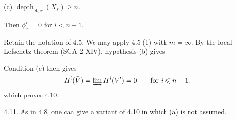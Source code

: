 (c) \underline{$\operatorname{depth}_{\mathrm{\acute{e}t},x}(X_s)
\geqslant n$.}

\underline{Then $\phi^i_x=0$ for $i<n-1$.}

Retain the notation of 4.5. We may apply 4.5 (1) with $m=\infty$.
By the local Lefschetz theorem (SGA 2 XIV), hypothesis (b) gives
\begin{center}
\end{center}
Condition (c) then gives
\[
H^i(\bar V)=\varinjlim H^i(V')=0
\qquad\text{for }i\leqslant n-1,
\]
which proves 4.10.

4.11. As in 4.8, one can give a variant of 4.10 in which (a) is not
assumed.


